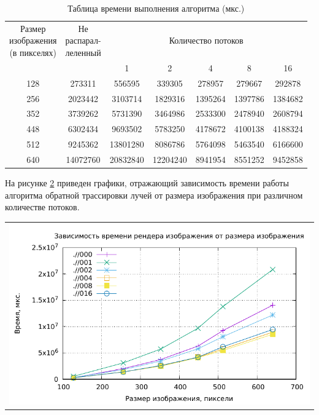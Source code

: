 \begin{table}[H]
	\begin{center}
		\caption{\label{tbl:profilingalgs1} Таблица времени выполнения алгоритма (мкс.)}
		\begin{tabular}{|c|c|c|c|c|c|c|}
			\hline
			\specialcell{Размер\\изображения\\(в пикселях)} &  \specialcell{Не\\ распарал-\\леленный}    & \multicolumn{5}{|c|}{Количество потоков}\\
			\cline{3-7}
			&   &1&2& 4&8&16\\ 
			
			\hline
			128 & 273311 & 556595 & 339305 & 278957 & 279667 & 292878 \\ \hline
			256 & 2023442 & 3103714 & 1829316 & 1395264 & 1397786 & 1384682 \\ \hline
			352 & 3739262 & 5731390 & 3464986 & 2533300 & 2478940 & 2608794 \\ \hline
			448 & 6302434 & 9693502 & 5783250 & 4178672 & 4100138 & 4188324 \\ \hline
			512 & 9245362 & 13801280 & 8086786 & 5764098 & 5463540 & 6166600 \\ \hline
			640 & 14072760 & 20832840 & 12204240 & 8941954 & 8551252 & 9452858 \\ \hline
			
			
			
		\end{tabular}
	\end{center}
\end{table}

На рисунке \ref{img:plot} приведен графики, отражающий зависимость
времени работы алгоритма обратной трассировки лучей от размера изображения при различном количестве потоков.

\begin{table}[H]
	\centering
	\begin{tabular}{p{1\linewidth}}
		\centering
		\includegraphics[width=0.83\linewidth]{assets/img/plot.pdf}
		\captionof{figure}{Зависимость
			времени работы алгоритма обратной трассировки лучей от размера изображения при различном количестве потоков}
		\label{img:plot}
	\end{tabular}
\end{table}

